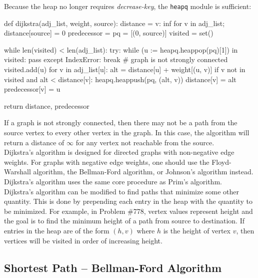 \documentclass[12pt, titlepage]{article}
\begin{document}
Because the heap no longer requires \textit{decrease-key}, the \texttt{heapq} module is sufficient: \medskip

\begin{python}
def dijkstra(adj_list, weight, source):
    distance = {v: inf for v in adj_list}; distance[source] = 0
    predecessor = {}
    pq = [(0, source)]
    visited = set()

    while len(visited) < len(adj_list):
        try:
            while (u := heapq.heappop(pq)[1]) in visited: pass
        except IndexError:
            break  # graph is not strongly connected
        visited.add(u)
        for v in adj_list[u]:
            alt = distance[u] + weight[(u, v)]
            if v not in visited and alt < distance[v]:
                heapq.heappush(pq, (alt, v))
                distance[v] = alt
                predecessor[v] = u

    return distance, predecessor
\end{python}

If a graph is not strongly connected, then there may not be a path from the source vertex to every other vertex in the graph. In this case, the algorithm will return a distance of $\infty$ for any vertex not reachable from the source. \\

Dijkstra's algorithm is designed for directed graphs with non-negative edge weights. For graphs with negative edge weights, one should use the Floyd-Warshall algorithm, the Bellman-Ford algorithm, or Johnson's algorithm instead. \\

Dijkstra's algorithm uses the same core procedure as Prim's algorithm. \\

Dijkstra's algorithm can be modified to find paths that minimize some other quantity. This is done by prepending each entry in the heap with the quantity to be minimized. For example, in Problem \#778, vertex values represent height and the goal is to find the minimum height of a path from source to destination. If entries in the heap are of the form $(h, v)$ where $h$ is the height of vertex $v$, then vertices will be visited in order of increasing height.

\subsection{Shortest Path -- Bellman-Ford Algorithm} \label{bellman-ford}
\end{document}

